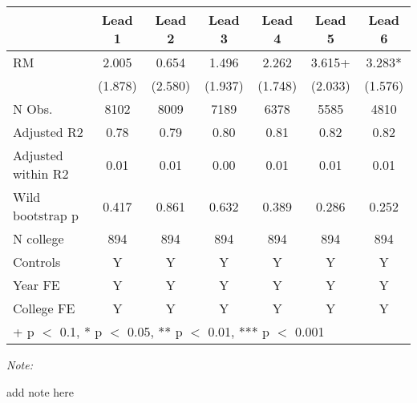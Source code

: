 \begin{table}
\centering
\begin{threeparttable}
\begin{tabular}[t]{lcccccc}
\toprule
  & Lead 1 & Lead 2 & Lead 3 & Lead 4 & Lead 5 & Lead 6\\
\midrule
RM & \num{2.005} & \num{0.654} & \num{1.496} & \num{2.262} & \num{3.615}+ & \num{3.283}*\\
 & (\num{1.878}) & (\num{2.580}) & (\num{1.937}) & (\num{1.748}) & (\num{2.033}) & (\num{1.576})\\
\midrule
N Obs. & \num{8102} & \num{8009} & \num{7189} & \num{6378} & \num{5585} & \num{4810}\\
Adjusted R2 & \num{0.78} & \num{0.79} & \num{0.80} & \num{0.81} & \num{0.82} & \num{0.82}\\
Adjusted within R2 & \num{0.01} & \num{0.01} & \num{0.00} & \num{0.01} & \num{0.01} & \num{0.01}\\
Wild bootstrap p & 0.417 & 0.861 & 0.632 & 0.389 & 0.286 & 0.252\\
N college & 894 & 894 & 894 & 894 & 894 & 894\\
Controls & Y & Y & Y & Y & Y & Y\\
Year FE & Y & Y & Y & Y & Y & Y\\
College FE & Y & Y & Y & Y & Y & Y\\
\bottomrule
\multicolumn{7}{l}{\rule{0pt}{1em}+ p $<$ 0.1, * p $<$ 0.05, ** p $<$ 0.01, *** p $<$ 0.001}\\
\end{tabular}
\begin{tablenotes}
\item \textit{Note: } 
\item add note here
\end{tablenotes}
\end{threeparttable}
\end{table}

